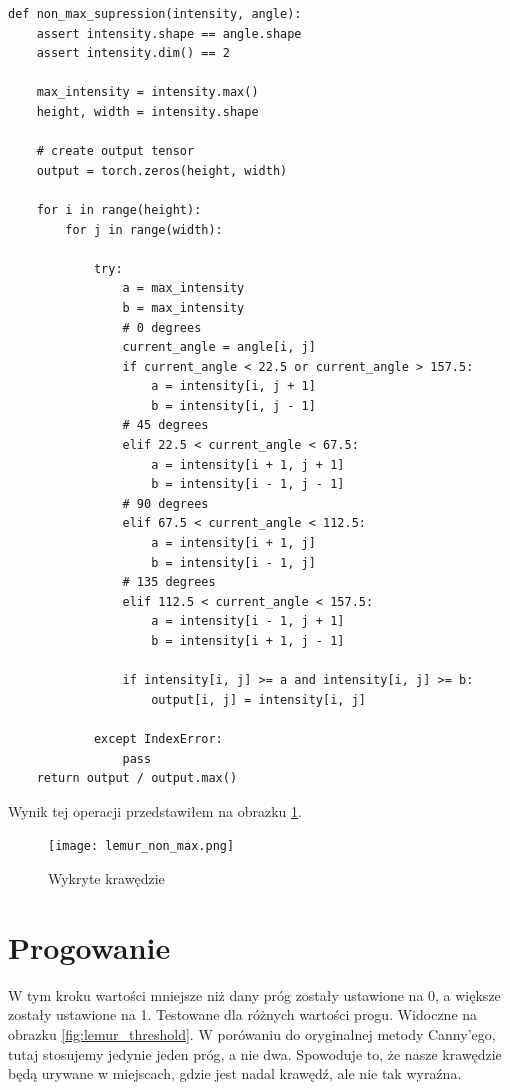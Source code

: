 \documentclass[a4paper]{article}
\begin{document}
\begin{lstlisting}
def non_max_supression(intensity, angle):
    assert intensity.shape == angle.shape
    assert intensity.dim() == 2

    max_intensity = intensity.max()
    height, width = intensity.shape

    # create output tensor
    output = torch.zeros(height, width)

    for i in range(height):
        for j in range(width):

            try:
                a = max_intensity
                b = max_intensity
                # 0 degrees
                current_angle = angle[i, j]
                if current_angle < 22.5 or current_angle > 157.5:
                    a = intensity[i, j + 1]
                    b = intensity[i, j - 1]
                # 45 degrees
                elif 22.5 < current_angle < 67.5:
                    a = intensity[i + 1, j + 1]
                    b = intensity[i - 1, j - 1]
                # 90 degrees
                elif 67.5 < current_angle < 112.5:
                    a = intensity[i + 1, j]
                    b = intensity[i - 1, j]
                # 135 degrees
                elif 112.5 < current_angle < 157.5:
                    a = intensity[i - 1, j + 1]
                    b = intensity[i + 1, j - 1]

                if intensity[i, j] >= a and intensity[i, j] >= b:
                    output[i, j] = intensity[i, j]

            except IndexError:
                pass
    return output / output.max()
\end{lstlisting}

Wynik tej operacji przedstawiłem na obrazku \ref{fig:lemur_edges}.

\begin{figure}[H]
    \centering
    \texttt{[image: lemur\_non\_max.png]}
    \caption{Wykryte krawędzie}
    \label{fig:lemur_edges}
\end{figure}

\section{Progowanie}

W tym kroku wartości mniejsze niż dany próg zostały ustawione na 0, a większe
zostały ustawione na 1. Testowane dla różnych wartości progu. Widoczne na obrazku
\ref{fig:lemur_threshold}. W porówaniu do oryginalnej metody Canny'ego, tutaj
stosujemy jedynie jeden próg, a nie dwa. Spowoduje to, że nasze krawędzie będą
urywane w miejscach, gdzie jest nadal krawędź, ale nie tak wyraźna.
\end{document}
